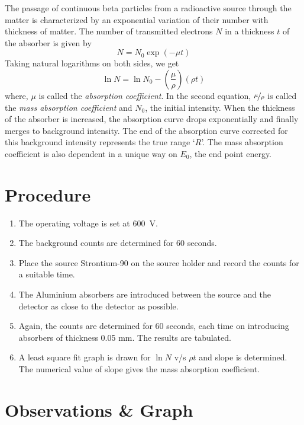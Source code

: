 	The passage of continuous beta particles from a radioactive source through the matter is characterized by an exponential variation of their number with thickness of matter. The number of transmitted electrons $ N $ in a thickness $ t $ of the absorber is given by
	\begin{equation}\label{eqn:mass-absorption}
		N = N_0 \exp(-\mu t)
	\end{equation}
	Taking natural logarithms on both sides, we get
	\begin{equation}\label{eqn:mass-absorption-log}
		\ln N = \ln N_0 - \left(\dfrac{\mu}{\rho}\right) (\rho t)
	\end{equation}
	where, $ \mu $ is called the \emph{absorption coefficient}. In the second equation, $ \nicefrac{\mu}{\rho} $ is called the \emph{mass absorption coefficient} and $ N_0 $, the initial intensity. When the thickness of the absorber is increased, the absorption curve drops exponentially and finally merges to background intensity. The end of the absorption curve corrected for this background intensity represents the true range `$ R $'. The mass absorption coefficient is also dependent in a unique way on $ E_0 $, the end point energy.
	
\section{Procedure}

\begin{enumerate}
	\item 	The operating voltage is set at \SI{600}{\volt}.
	\item 	The background counts are determined for 60 seconds.
	\item 	Place the source Strontium-90 on the source holder and record the counts for a suitable time.
	\item 	The Aluminium absorbers are introduced between the source and the detector as close to the detector as possible.
	\item 	Again, the counts are determined for 60 seconds, each time on introducing absorbers of thickness 0.05 mm. The results are tabulated.
	\item 	A least square fit graph is drawn for $ \ln N $ v/s $ \rho t $ and slope is determined. The numerical value of slope gives the mass absorption coefficient.
	
\end{enumerate}

\newpage
\section{Observations \& Graph}

